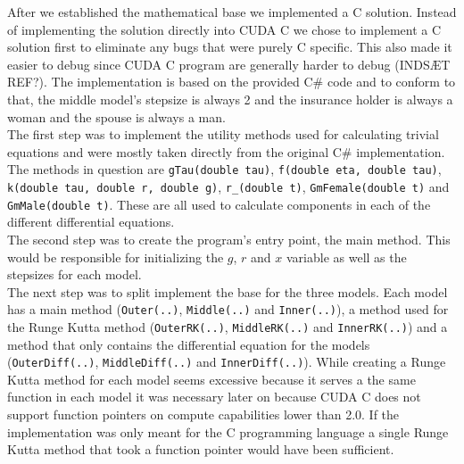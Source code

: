 
After we established the mathematical base we implemented a C solution. Instead of implementing the solution directly into CUDA C we chose to implement a C solution first to eliminate any bugs that were purely C specific. This also made it easier to debug since CUDA C program are generally harder to debug (INDSÆT REF?). The implementation is based on the provided C\# code and to conform to that, the middle model's stepsize is always 2 and the insurance holder is always a woman and the spouse is always a man. \\

The first step was to implement the utility methods used for calculating trivial equations and were mostly taken directly from the original C\# implementation. The methods in question are \texttt{gTau(double tau)}, \texttt{f(double eta, double tau)}, \texttt{k(double tau, double r, double g)}, \texttt{r\_(double t)}, \texttt{GmFemale(double t)} and \texttt{GmMale(double t)}. These are all used to calculate components in each of the different differential equations. \\

The second step was to create the program's entry point, the main method. This would be responsible for initializing the $g$, $r$ and $x$ variable as well as the stepsizes for each model. \\

The next step was to split implement the base for the three models. Each model has a main method (\texttt{Outer(..)}, \texttt{Middle(..)} and \texttt{Inner(..)}), a method used for the Runge Kutta method (\texttt{OuterRK(..)}, \texttt{MiddleRK(..)} and \texttt{InnerRK(..)}) and a method that only contains the differential equation for the models (\texttt{OuterDiff(..)}, \texttt{MiddleDiff(..)} and \texttt{InnerDiff(..)}). While creating a Runge Kutta method for each model seems excessive because it serves a the same function in each model it was necessary later on because CUDA C does not support function pointers on compute capabilities lower than 2.0. If the implementation was only meant for the C programming language a single Runge Kutta method that took a function pointer would have been sufficient. \\

